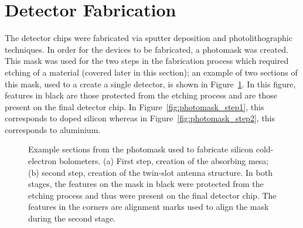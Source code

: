 \section{Detector Fabrication}\label{sec:fabrication}
The detector chips were fabricated via sputter deposition and photolithographic techniques. In order for the devices to be fabricated, a photomask was created. This mask was used for the two steps in the fabrication process which required etching of a material (covered later in this section); an example of two sections of this mask, used to a create a single detector, is shown in Figure~\ref{fig:photomask}. In this figure, features in black are those protected from the etching process and are those present on the final detector chip. In Figure~\ref{fig:photomask_step1}, this corresponds to doped silicon whereas in Figure~\ref{fig:photomask_step2}, this corresponds to aluminium.
\begin{figure}[tb]
\begin{center}
\hspace{0.1\textwidth}
\caption[Example sections from photomask]{Example sections from the photomask used to fabricate silicon cold-electron bolometers. (a) First step, creation of the absorbing mesa; (b) second step, creation of the twin-slot antenna structure. In both stages, the features on the mask in black were protected from the etching process and thus were present on the final detector chip. The features in the corners are alignment marks used to align the mask during the second stage.}
\label{fig:photomask}
\end{center}
\end{figure}
